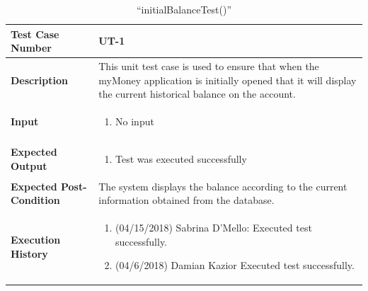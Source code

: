 \documentclass[12pt]{article}
\begin{document}
\begin{table}[H]
\caption{“initialBalanceTest()”}
\begin{center}
\begin{tabular}{|p{5.5cm}|p{11cm}|}
  \hline
  \bf Test Case Number & UT-1\\\hline
  \bf Description & 
  This unit test case is used to ensure that when the myMoney application is initially opened that it will display the current historical balance on the account.\\\hline
  \bf Input &
  \begin{enumerate}
  \item No input
  \end{enumerate}
  \\\hline
  \bf Expected Output &
  \begin{enumerate}
  \item Test was executed successfully
  \end{enumerate}
  \\\hline
  \bf Expected Post-Condition & 
  The system displays the balance according to the current information obtained from the database.
  \\\hline   
  \bf Execution History & 
  \begin{enumerate}
  \item (04/15/2018) Sabrina D’Mello: Executed test successfully.
  \item (04/6/2018) Damian Kazior Executed test successfully.
  \end{enumerate}
  \\\hline
\end{tabular}
\end{center}
\end{table}
\end{document}

